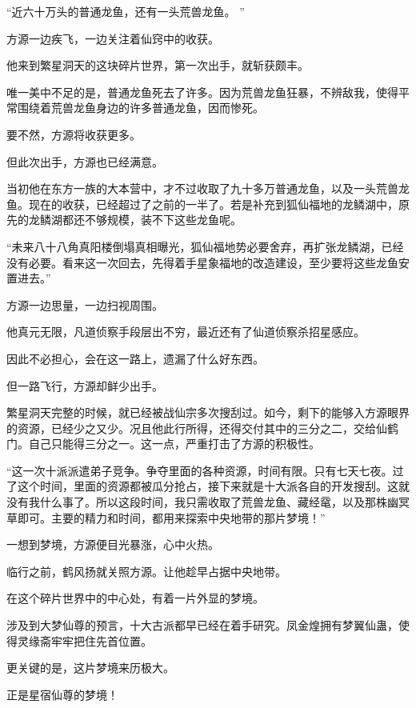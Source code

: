 
\begin{this_body}

“近六十万头的普通龙鱼，还有一头荒兽龙鱼。 ”

方源一边疾飞，一边关注着仙窍中的收获。

他来到繁星洞天的这块碎片世界，第一次出手，就斩获颇丰。

唯一美中不足的是，普通龙鱼死去了许多。因为荒兽龙鱼狂暴，不辨敌我，使得平常围绕着荒兽龙鱼身边的许多普通龙鱼，因而惨死。

要不然，方源将收获更多。

但此次出手，方源也已经满意。

当初他在东方一族的大本营中，才不过收取了九十多万普通龙鱼，以及一头荒兽龙鱼。现在的收获，已经超过了之前的一半了。若是补充到狐仙福地的龙鳞湖中，原先的龙鳞湖都还不够规模，装不下这些龙鱼呢。

“未来八十八角真阳楼倒塌真相曝光，狐仙福地势必要舍弃，再扩张龙鳞湖，已经没有必要。看来这一次回去，先得着手星象福地的改造建设，至少要将这些龙鱼安置进去。”

方源一边思量，一边扫视周围。

他真元无限，凡道侦察手段层出不穷，最近还有了仙道侦察杀招星感应。

因此不必担心，会在这一路上，遗漏了什么好东西。

但一路飞行，方源却鲜少出手。

繁星洞天完整的时候，就已经被战仙宗多次搜刮过。如今，剩下的能够入方源眼界的资源，已经少之又少。况且他此行所得，还得交付其中的三分之二，交给仙鹤门。自己只能得三分之一。这一点，严重打击了方源的积极性。

“这一次十派派遣弟子竞争。争夺里面的各种资源，时间有限。只有七天七夜。过了这个时间，里面的资源都被瓜分抢占，接下来就是十大派各自的开发搜刮。这就没有我什么事了。所以这段时间，我只需收取了荒兽龙鱼、藏经鼋，以及那株幽冥草即可。主要的精力和时间，都用来探索中央地带的那片梦境！”

一想到梦境，方源便目光暴涨，心中火热。

临行之前，鹤风扬就关照方源。让他趁早占据中央地带。

在这个碎片世界中的中心处，有着一片外显的梦境。

涉及到大梦仙尊的预言，十大古派都早已经在着手研究。凤金煌拥有梦翼仙蛊，使得灵缘斋牢牢把住先首位置。

更关键的是，这片梦境来历极大。

正是星宿仙尊的梦境！


\end{this_body}
